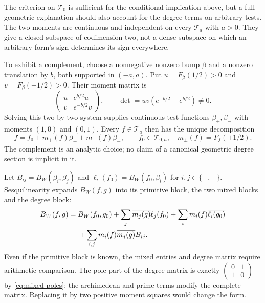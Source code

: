 \documentclass[11pt,letterpaper]{article}
\theoremstyle{definition}
\theoremstyle{remark}
\newcommand{\T}{\mathcal T}
\begin{document}
The criterion on $\T_0$ is sufficient for the conditional
implication above, but a full geometric explanation should also
account for the degree terms on arbitrary tests. The two moments
are continuous and independent on every $\T_a$ with $a>0$.
They give a closed subspace of codimension two, not a dense
subspace on which an arbitrary form's sign determines its sign
everywhere.

To exhibit a complement, choose a nonnegative nonzero bump
$\beta$ and a nonzero translation by $b$, both supported in
$(-a,a)$. Put $u=F_\beta(1/2)>0$ and $v=F_\beta(-1/2)>0$.
Their moment matrix is
\begin{equation}
 \begin{pmatrix}u&e^{b/2}u\\v&e^{-b/2}v\end{pmatrix},\qquad
 \det=uv(e^{-b/2}-e^{b/2})\ne0.
 \label{eq:moment-matrix}
\end{equation}
Solving this two-by-two system supplies continuous test functions
$\beta_+,\beta_-$ with moments $(1,0)$ and $(0,1)$.
Every $f\in\T_a$ then has the unique decomposition
\begin{equation}
 f=f_0+m_+(f)\beta_++m_-(f)\beta_-,\qquad
 f_0\in\T_{0,a},\quad m_\pm(f)=F_f(\pm1/2).
 \label{eq:moment-splitting}
\end{equation}
The complement is an analytic choice; no claim of a canonical
geometric degree section is implicit in it.

Let $B_{ij}=B_W(\beta_i,\beta_j)$ and
$\ell_i(f_0)=B_W(f_0,\beta_i)$ for $i,j\in\{+,-\}$.
Sesquilinearity expands $B_W(f,g)$ into its primitive block,
the two mixed blocks and the degree block:
\begin{align}
 B_W(f,g)={}&B_W(f_0,g_0)
 +\sum_j\overline{m_j(g)}\ell_j(f_0)
 +\sum_i m_i(f)\overline{\ell_i(g_0)}\notag\\
 &+\sum_{i,j}m_i(f)\overline{m_j(g)}B_{ij}.
 \label{eq:full-block}
\end{align}
Even if the primitive block is known, the mixed entries and
degree matrix require arithmetic comparison. The pole part of
the degree matrix is exactly
$\left(\begin{smallmatrix}0&1\\1&0\end{smallmatrix}\right)$ by
\eqref{eq:mixed-poles}; the archimedean and prime terms modify
the complete matrix. Replacing it by two positive moment
squares would change the form.
\end{document}
